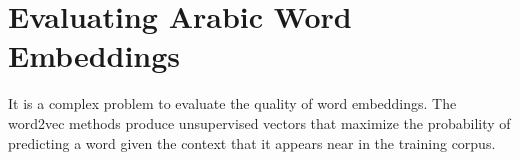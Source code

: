 \section{Evaluating Arabic Word Embeddings}
\label{sec:evaluation}


It is a complex problem to evaluate the quality of word embeddings. The word2vec methods produce unsupervised vectors that maximize the probability of predicting a word given the context that it appears near in the training corpus. 





